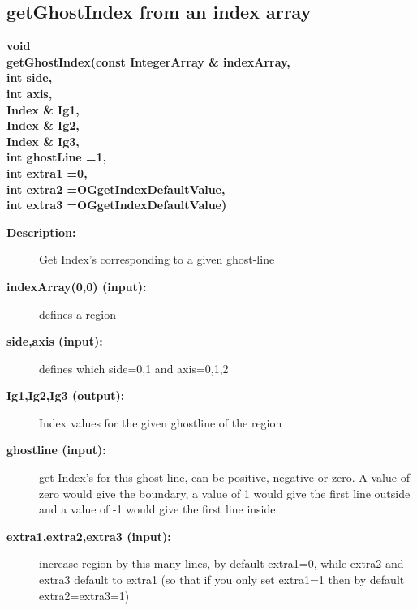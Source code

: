 \subsection{getGhostIndex from an index array}
 
\begin{flushleft} \textbf{%
void  \\ 
\settowidth{\OGgetIndexIncludeArgIndent}{getGhostIndex(}%
getGhostIndex(const IntegerArray \& indexArray, \\ 
\hspace{\OGgetIndexIncludeArgIndent}int side, \\ 
\hspace{\OGgetIndexIncludeArgIndent}int axis, \\ 
\hspace{\OGgetIndexIncludeArgIndent}Index \& Ig1, \\ 
\hspace{\OGgetIndexIncludeArgIndent}Index \& Ig2, \\ 
\hspace{\OGgetIndexIncludeArgIndent}Index \& Ig3, \\ 
\hspace{\OGgetIndexIncludeArgIndent}int ghostLine =1,\\ 
\hspace{\OGgetIndexIncludeArgIndent}int extra1 =0,\\ 
\hspace{\OGgetIndexIncludeArgIndent}int extra2 =OGgetIndexDefaultValue,\\ 
\hspace{\OGgetIndexIncludeArgIndent}int extra3      =OGgetIndexDefaultValue)
}\end{flushleft}
\begin{description}
\item[{\bf Description:}] 
    Get Index's corresponding to a given ghost-line

\item[{\bf indexArray(0,0) (input):}]  defines a region
\item[{\bf side,axis (input):}]  defines which side=0,1 and axis=0,1,2
\item[{\bf Ig1,Ig2,Ig3 (output):}]  Index values for the given ghostline of the region
\item[{\bf ghostline (input):}]  get Index's for this ghost line, can be positive, negative or zero.
        A value of zero would give the boundary, a value of 1 would give the first
        line outside and a value of -1 would give the first line inside.
\item[{\bf extra1,extra2,extra3 (input):}]  increase region by this many lines, by default extra1=0, while 
                         extra2 and extra3 default to extra1 (so that if you only set extra1=1
                         then by default extra2=extra3=1)
\end{description}
